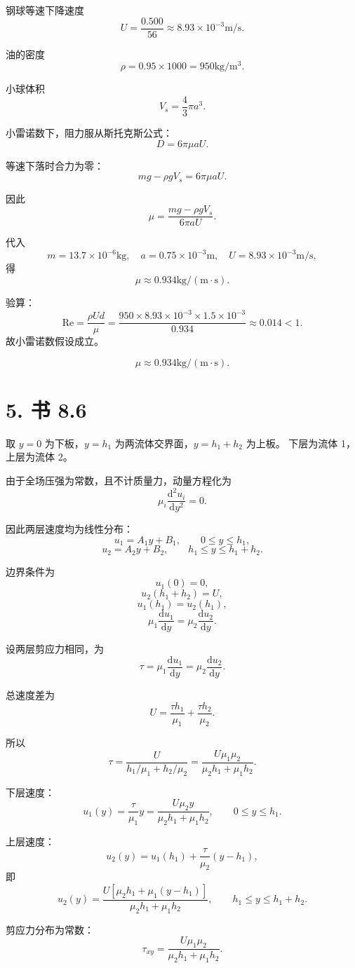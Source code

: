 \documentclass[12pt,a4paper]{ctexart}
\newcommand{\Rey}{\mathrm{Re}}
\newcommand{\dd}{\mathrm d}
\begin{document}
钢球等速下降速度
\[
U=\frac{0.500}{56}
\approx8.93\times10^{-3}\mathrm{m/s}.
\]

油的密度
\[
\rho=0.95\times1000=950\mathrm{kg/m^3}.
\]

小球体积
\[
V_s=\frac43\pi a^3.
\]

小雷诺数下，阻力服从斯托克斯公式：
\[
D=6\pi\mu aU.
\]

等速下落时合力为零：
\[
mg-\rho gV_s=6\pi\mu aU.
\]

因此
\[
\mu=\frac{mg-\rho gV_s}{6\pi aU}.
\]

代入
\[
m=13.7\times10^{-6}\mathrm{kg},\quad
a=0.75\times10^{-3}\mathrm m,\quad
U=8.93\times10^{-3}\mathrm{m/s},
\]
得
\[
\mu\approx0.934\mathrm{kg/(m\cdot s)}.
\]

验算：
\[
\Rey=\frac{\rho Ud}{\mu}
=\frac{950\times8.93\times10^{-3}\times1.5\times10^{-3}}{0.934}
\approx0.014<1.
\]
故小雷诺数假设成立。

\[
\boxed{\mu\approx0.934\mathrm{kg/(m\cdot s)}}.
\]

\section*{5. 书 8.6}

取 \(y=0\) 为下板，\(y=h_1\) 为两流体交界面，\(y=h_1+h_2\) 为上板。
下层为流体 1，上层为流体 2。

由于全场压强为常数，且不计质量力，动量方程化为
\[
\mu_i\frac{\dd^2u_i}{\dd y^2}=0.
\]

因此两层速度均为线性分布：
\[
u_1=A_1y+B_1,\qquad 0\le y\le h_1,
\]
\[
u_2=A_2y+B_2,\qquad h_1\le y\le h_1+h_2.
\]

边界条件为
\[
u_1(0)=0,
\]
\[
u_2(h_1+h_2)=U,
\]
\[
u_1(h_1)=u_2(h_1),
\]
\[
\mu_1\frac{\dd u_1}{\dd y}
=
\mu_2\frac{\dd u_2}{\dd y}.
\]

设两层剪应力相同，为
\[
\tau=\mu_1\frac{\dd u_1}{\dd y}
=\mu_2\frac{\dd u_2}{\dd y}.
\]

总速度差为
\[
U=\frac{\tau h_1}{\mu_1}+\frac{\tau h_2}{\mu_2}.
\]

所以
\[
\tau=
\frac{U}{h_1/\mu_1+h_2/\mu_2}
=\frac{U\mu_1\mu_2}{\mu_2h_1+\mu_1h_2}.
\]

下层速度：
\[
u_1(y)=\frac{\tau}{\mu_1}y
=
\frac{U\mu_2 y}{\mu_2h_1+\mu_1h_2},
\qquad 0\le y\le h_1.
\]

上层速度：
\[
u_2(y)=u_1(h_1)+\frac{\tau}{\mu_2}(y-h_1),
\]
即
\[
u_2(y)
=
\frac{U\left[\mu_2h_1+\mu_1(y-h_1)\right]}
{\mu_2h_1+\mu_1h_2},
\qquad h_1\le y\le h_1+h_2.
\]

剪应力分布为常数：
\[
\boxed{
\tau_{xy}=
\frac{U\mu_1\mu_2}{\mu_2h_1+\mu_1h_2}
}.
\]
\end{document}

